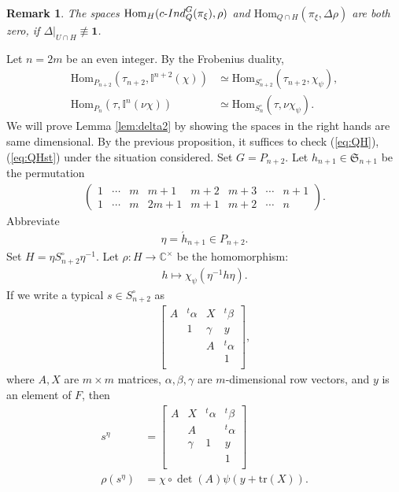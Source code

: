 \documentclass[11pt]{amsart}
\newcommand\Sf{{\mathfrak{S}}}
\newcommand\C{{\mathbb{C}}}%
\newcommand\Ib{{\mathbb{I}}}
\newcommand\1{\mathbf{1}}
\newcommand\tr{\mathrm{tr}}
\newcommand\ac{\acute}
\newcommand\Hom{{\mathrm{Hom}}}%
\newcommand\cI{{\rm c\mathchar`- Ind}}
\newcommand\tm{\times}
\numberwithin{equation}{section}
\newtheorem{rem}[thm]{Remark}
\begin{document}
\begin{rem}
The spaces $\Hom_H(\cI_Q^G(\pi_\xi),\rho)$ and $\Hom_{Q \cap H}(\pi_\xi, \Delta \rho)$ are both zero, if $\Delta|_{U \cap H} \not\equiv \1$.
\end{rem}
Let $n = 2m$ be an even integer.
By the Frobenius duality, 
\begin{align*}
\Hom_{P_{n+2}}(\tau_{n+2}, \Ib^{n+2}(\chi)) &\simeq \Hom_{S_{n+2}^\circ}(\tau_{n+2}, \chi_\psi), \\
\Hom_{P_{n}}(\tau, \Ib^{n}(\nu\chi)) &\simeq \Hom_{S_{n}^\circ}(\tau, \nu\chi_\psi).
\end{align*} 
We will prove Lemma \ref{lem:delta2} by showing the spaces in the right hands are same dimensional.
By the previous proposition, it suffices to check (\ref{eq:QH}), (\ref{eq:QHst}) under the situation considered.
Set $G = P_{n+2}$.
Let $h_{n+1} \in \Sf_{n+1}$ be the permutation 
\begin{align}
\left(\begin{array}{cccccccc}
1& \cdots & m & m+1 & m+2  & m+3 & \cdots & n+1 \\
1 & \cdots & m & 2m+1 & m+1 & m+2 & \cdots & n 
\end{array}\right). \label{def:hn+1}
\end{align} 
Abbreviate
\begin{align}
\eta = \ac{h}_{n+1} \in P_{n+2}. \label{def:h}
\end{align} 
Set $H = \eta S_{n+2}^{\circ}\eta^{-1}$.
Let $\rho: H \to \C^\tm$ be the homomorphism: 
\begin{align*}
h \longmapsto \chi_\psi(\eta^{-1}h\eta ).
\end{align*}
If we write a typical $s \in S_{n+2}^\circ$ as
\begin{align*}
\begin{bmatrix}
A & {}^t \alpha & X &{}^t \beta  \\
& 1 & \gamma &  y \\
& &A & {}^t \alpha  \\
& & & 1 \\
\end{bmatrix},
\end{align*} 
where $A,X$ are $m \tm m$ matrices, $\alpha, \beta, \gamma$ are $m$-dimensional row vectors, and $y$ is an element of $F$, then 
\begin{align*}
s^\eta &= \begin{bmatrix}
A & X & {}^t\alpha & {}^t\beta \\
& A & & {}^t\alpha \\
& \gamma &1 & y \\
& & & 1 \\
\end{bmatrix} \\
\rho(s^\eta) &= \chi \circ \det(A)\psi(y + \tr(X)).
\end{align*} 
\end{document}
